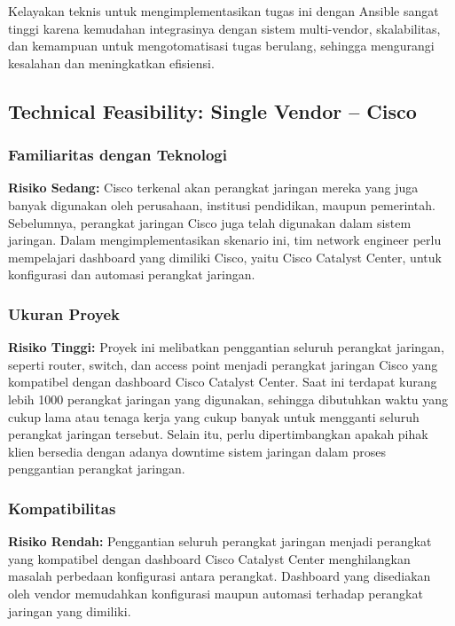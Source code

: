 Kelayakan teknis untuk mengimplementasikan tugas ini dengan Ansible sangat tinggi karena kemudahan integrasinya dengan sistem multi-vendor, skalabilitas, dan kemampuan untuk mengotomatisasi tugas berulang, sehingga mengurangi kesalahan dan meningkatkan efisiensi.


\subsection{Technical Feasibility: Single Vendor – Cisco}

\subsubsection{Familiaritas dengan Teknologi}

\textbf{Risiko Sedang:} Cisco terkenal akan perangkat jaringan mereka yang juga banyak digunakan oleh perusahaan, institusi pendidikan, maupun pemerintah. Sebelumnya, perangkat jaringan Cisco juga telah digunakan dalam sistem jaringan. Dalam mengimplementasikan skenario ini, tim network engineer perlu mempelajari dashboard yang dimiliki Cisco, yaitu Cisco Catalyst Center, untuk konfigurasi dan automasi perangkat jaringan.

\subsubsection{Ukuran Proyek}

\textbf{Risiko Tinggi:} Proyek ini melibatkan penggantian seluruh perangkat jaringan, seperti router, switch, dan access point menjadi perangkat jaringan Cisco yang kompatibel dengan dashboard Cisco Catalyst Center. Saat ini terdapat kurang lebih 1000 perangkat jaringan yang digunakan, sehingga dibutuhkan waktu yang cukup lama atau tenaga kerja yang cukup banyak untuk mengganti seluruh perangkat jaringan tersebut. Selain itu, perlu dipertimbangkan apakah pihak klien bersedia dengan adanya downtime sistem jaringan dalam proses penggantian perangkat jaringan.

\subsubsection{Kompatibilitas}

\textbf{Risiko Rendah:} Penggantian seluruh perangkat jaringan menjadi perangkat yang kompatibel dengan dashboard Cisco Catalyst Center menghilangkan masalah perbedaan konfigurasi antara perangkat. Dashboard yang disediakan oleh vendor memudahkan konfigurasi maupun automasi terhadap perangkat jaringan yang dimiliki.

